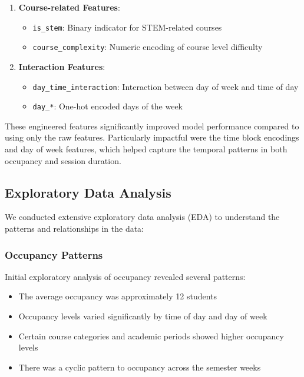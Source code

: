\documentclass[12pt,letterpaper]{article}
\begin{document}
\begin{enumerate}
    \item \textbf{Course-related Features}:
    \begin{itemize}
        \item \texttt{is\_stem}: Binary indicator for STEM-related courses
        \item \texttt{course\_complexity}: Numeric encoding of course level difficulty
    \end{itemize}

    \item \textbf{Interaction Features}:
    \begin{itemize}
        \item \texttt{day\_time\_interaction}: Interaction between day of week and time of day
        \item \texttt{day\_*}: One-hot encoded days of the week
    \end{itemize}
\end{enumerate}

These engineered features significantly improved model performance compared to using only the raw features. Particularly impactful were the time block encodings and day of week features, which helped capture the temporal patterns in both occupancy and session duration.

\subsection{Exploratory Data Analysis}

We conducted extensive exploratory data analysis (EDA) to understand the patterns and relationships in the data:

\subsubsection{Occupancy Patterns}

Initial exploratory analysis of occupancy revealed several patterns:
\begin{itemize}
    \item The average occupancy was approximately 12 students
    \item Occupancy levels varied significantly by time of day and day of week
    \item Certain course categories and academic periods showed higher occupancy levels
    \item There was a cyclic pattern to occupancy across the semester weeks
\end{itemize}
\end{document}
